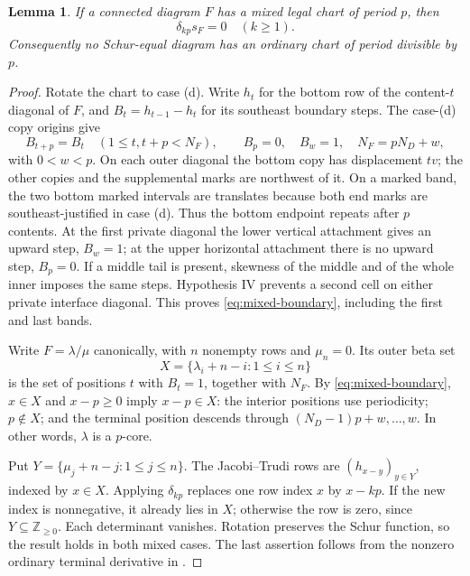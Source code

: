 \documentclass[11pt,a4paper]{amsart}
\numberwithin{equation}{section}
\theoremstyle{plain}
\newtheorem{lemma}[theorem]{Lemma}
\theoremstyle{definition}
\newcommand{\Z}{\mathbb Z}
\begin{document}
\begin{lemma}\label{lem:mixed-vanishing}
If a connected diagram \(F\) has a mixed legal chart of period \(p\), then
\[
 \delta_{kp}s_F=0\quad(k\ge1).
\]
Consequently no Schur-equal diagram has an ordinary chart of period divisible by \(p\).
\end{lemma}
\begin{proof}
Rotate the chart to case (d).  Write \(h_t\) for the bottom row of the content-\(t\) diagonal of \(F\), and \(B_t=h_{t-1}-h_t\) for its southeast boundary steps.  The case-(d) copy origins give
\begin{equation}\label{eq:mixed-boundary}
 B_{t+p}=B_t\quad(1\le t,t+p<N_F),\qquad
 B_p=0,\quad B_w=1,\quad N_F=pN_D+w,
\end{equation}
with \(0<w<p\).  On each outer diagonal the bottom copy has displacement \(tv\); the other copies and the supplemental marks are northwest of it.  On a marked band, the two bottom marked intervals are translates because both end marks are southeast-justified in case (d).  Thus the bottom endpoint repeats after \(p\) contents.  At the first private diagonal the lower vertical attachment gives an upward step, \(B_w=1\); at the upper horizontal attachment there is no upward step, \(B_p=0\).  If a middle tail is present, skewness of the middle and of the whole inner imposes the same steps.  Hypothesis IV prevents a second cell on either private interface diagonal.  This proves \eqref{eq:mixed-boundary}, including the first and last bands.

Write \(F=\lambda/\mu\) canonically, with \(n\) nonempty rows and \(\mu_n=0\).  Its outer beta set
\begin{equation*}
 X=\{\lambda_i+n-i:1\le i\le n\}
\end{equation*}
is the set of positions \(t\) with \(B_t=1\), together with \(N_F\).  By \eqref{eq:mixed-boundary}, \(x\in X\) and \(x-p\ge0\) imply \(x-p\in X\): the interior positions use periodicity; \(p\notin X\); and the terminal position descends through \((N_D-1)p+w,\ldots,w\).  In other words, \(\lambda\) is a \(p\)-core.

Put \(Y=\{\mu_j+n-j:1\le j\le n\}\).  The Jacobi--Trudi rows are \((h_{x-y})_{y\in Y}\), indexed by \(x\in X\).  Applying \(\delta_{kp}\) replaces one row index \(x\) by \(x-kp\).  If the new index is nonnegative, it already lies in \(X\); otherwise the row is zero, since \(Y\subseteq\Z_{\ge0}\).  Each determinant vanishes.  Rotation preserves the Schur function, so the result holds in both mixed cases.  The last assertion follows from the nonzero ordinary terminal derivative in .
\end{proof}
\end{document}
